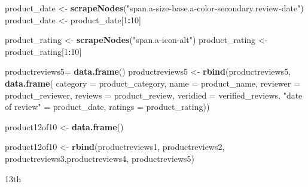 \documentclass[
]{article}
\newenvironment{Shaded}{\begin{snugshade}}{\end{snugshade}}
\newcommand{\AttributeTok}[1]{\textcolor[rgb]{0.13,0.29,0.53}{#1}}
\newcommand{\DecValTok}[1]{\textcolor[rgb]{0.00,0.00,0.81}{#1}}
\newcommand{\FunctionTok}[1]{\textcolor[rgb]{0.13,0.29,0.53}{\textbf{#1}}}
\newcommand{\NormalTok}[1]{#1}
\newcommand{\OtherTok}[1]{\textcolor[rgb]{0.56,0.35,0.01}{#1}}
\newcommand{\SpecialCharTok}[1]{\textcolor[rgb]{0.81,0.36,0.00}{\textbf{#1}}}
\newcommand{\StringTok}[1]{\textcolor[rgb]{0.31,0.60,0.02}{#1}}
\begin{document}
\begin{Shaded}
\begin{Highlighting}[]
\NormalTok{  product\_date }\OtherTok{\textless{}{-}} \FunctionTok{scrapeNodes}\NormalTok{(}\StringTok{"span.a{-}size{-}base.a{-}color{-}secondary.review{-}date"}\NormalTok{)}
\NormalTok{  product\_date }\OtherTok{\textless{}{-}}\NormalTok{ product\_date[}\DecValTok{1}\SpecialCharTok{:}\DecValTok{10}\NormalTok{]}
  
\NormalTok{  product\_rating }\OtherTok{\textless{}{-}} \FunctionTok{scrapeNodes}\NormalTok{(}\StringTok{"span.a{-}icon{-}alt"}\NormalTok{)}
\NormalTok{  product\_rating }\OtherTok{\textless{}{-}}\NormalTok{ product\_rating[}\DecValTok{1}\SpecialCharTok{:}\DecValTok{10}\NormalTok{]}
  
\NormalTok{  productreviews5}\OtherTok{=} \FunctionTok{data.frame}\NormalTok{()}
\NormalTok{  productreviews5 }\OtherTok{\textless{}{-}} \FunctionTok{rbind}\NormalTok{(productreviews5, }\FunctionTok{data.frame}\NormalTok{(}
                      \AttributeTok{category =}\NormalTok{ product\_category,}
                      \AttributeTok{name =}\NormalTok{ product\_name,}
                      \AttributeTok{reviewer =}\NormalTok{ product\_reviewer,}
                      \AttributeTok{reviews =}\NormalTok{ product\_review,}
                      \AttributeTok{veridied =}\NormalTok{ verified\_reviews,}
                      \StringTok{"date of review"} \OtherTok{=}\NormalTok{ product\_date,}
                      \AttributeTok{ratings =}\NormalTok{ product\_rating))}
  
\NormalTok{  product12of10 }\OtherTok{\textless{}{-}} \FunctionTok{data.frame}\NormalTok{()}
  
\NormalTok{  product12of10 }\OtherTok{\textless{}{-}} \FunctionTok{rbind}\NormalTok{(productreviews1, productreviews2, productreviews3,productreviews4, productreviews5)}
\end{Highlighting}
\end{Shaded}

13th
\end{document}
